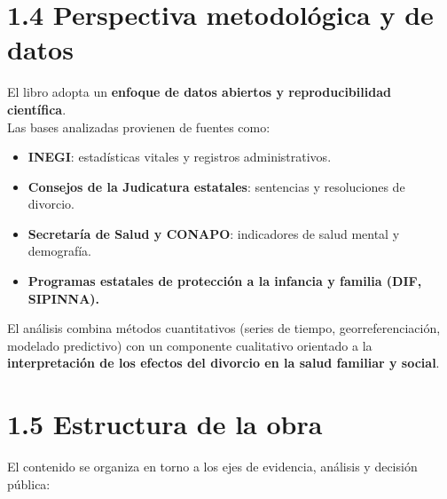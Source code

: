 \documentclass[
  letterpaper,
  DIV=11,
  numbers=noendperiod]{scrreprt}
\providecommand{\tightlist}{%
  \setlength{\itemsep}{0pt}\setlength{\parskip}{0pt}}
\begin{document}

\chapter{1.4 Perspectiva metodológica y de
datos}\label{perspectiva-metodoluxf3gica-y-de-datos}

El libro adopta un \textbf{enfoque de datos abiertos y reproducibilidad
científica}.\\
Las bases analizadas provienen de fuentes como:

\begin{itemize}
\tightlist
\item
  \textbf{INEGI}: estadísticas vitales y registros administrativos.\\
\item
  \textbf{Consejos de la Judicatura estatales}: sentencias y
  resoluciones de divorcio.\\
\item
  \textbf{Secretaría de Salud y CONAPO}: indicadores de salud mental y
  demografía.\\
\item
  \textbf{Programas estatales de protección a la infancia y familia
  (DIF, SIPINNA).}
\end{itemize}

El análisis combina métodos cuantitativos (series de tiempo,
georreferenciación, modelado predictivo) con un componente cualitativo
orientado a la \textbf{interpretación de los efectos del divorcio en la
salud familiar y social}.


\chapter{1.5 Estructura de la obra}\label{estructura-de-la-obra}

El contenido se organiza en torno a los ejes de evidencia, análisis y
decisión pública:
\end{document}
